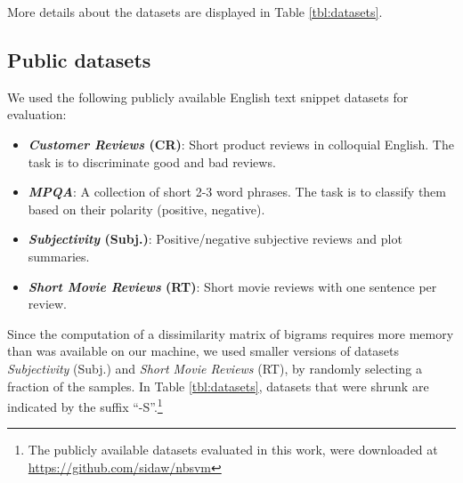 More details about the datasets are displayed in Table \ref{tbl:datasets}. 

\subsection{Public datasets}

We used the following publicly available English text snippet datasets for
evaluation:

\begin{itemize}
  \item \textbf{\textit{Customer Reviews} (CR)}: Short product reviews in
  colloquial English. The task is to discriminate good and bad reviews.
  \item \textbf{\textit{MPQA}}: A collection of short 2-3 word phrases. The task is to
  classify them based on their polarity (positive, negative).
  \item \textbf{\textit{Subjectivity} (Subj.)}:  Positive/negative subjective
  reviews and plot summaries.
  \item \textbf{\textit{Short Movie Reviews} (RT)}: Short movie reviews with one
  sentence per review.
\end{itemize}

Since the computation of a dissimilarity matrix of bigrams requires more memory
than was available on our machine, we used smaller versions of datasets \textit{Subjectivity} (Subj.)
and \textit{Short Movie Reviews} (RT), by
randomly selecting a fraction of the samples. In Table \ref{tbl:datasets}, 
datasets that were shrunk are indicated by the suffix ``-S''.\footnote{The publicly available datasets evaluated in this work, were downloaded at \url{https://github.com/sidaw/nbsvm}}

